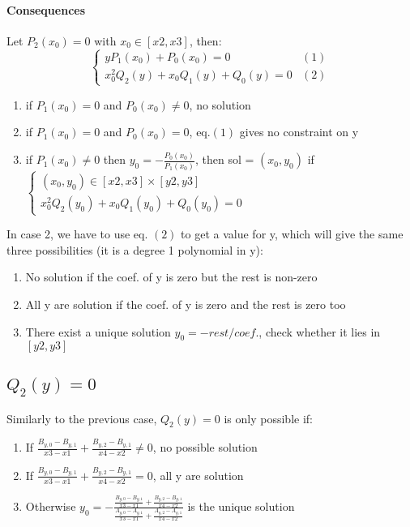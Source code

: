 \documentclass[paper=a4, fontsize=11pt]{scrartcl}
\numberwithin{equation}{section}		%
\numberwithin{figure}{section}			%
\numberwithin{table}{section}				%
\begin{document}
\paragraph{\textbf{Consequences}}

Let $P_2(x_0)=0$ with $x_0 \in [x2,x3]$, then:
$$
\left \{
\begin{array}{ll}
yP_1(x_0) + P_0(x_0) = 0 & (1)\\
x_0^2 Q_2(y) + x_0Q_1(y) + Q_0(y) = 0 & (2)
\end{array}
\right.
$$

\begin{enumerate}
\item if $P_1(x_0)=0$ and $P_0(x_0)\neq0$, no solution
\item if $P_1(x_0)=0$ and $P_0(x_0)=0$, eq.$(1)$ gives no constraint on y
\item if $P_1(x_0)\neq0$ then $y_0 = -\frac{P_0(x_0)}{P_1(x_0)}$, then sol = $(x_0,y_0)$ if $\left\{\begin{array}{l}(x_0,y_0) \in [x2,x3]\times[y2,y3]\\x_0^2 Q_2(y_0) + x_0Q_1(y_0) + Q_0(y_0) = 0 \end{array}\right.$
\end{enumerate}

In case 2, we have to use eq. $(2)$ to get a value for y, which will give the same three possibilities (it is a degree 1 polynomial in y):
\begin{enumerate}
\item No solution if the coef. of y is zero but the rest is non-zero
\item All y are solution if the coef. of y is zero and the rest is zero too
\item There exist a unique solution $y_0 = -rest/coef.$, check whether it lies in $[y2,y3]$
\end{enumerate}


\newpage
\subsection{$Q_2(y) = 0$}

Similarly to the previous case, $Q_2(y) = 0$ is only possible if:
\begin{enumerate}
\item If $\frac{B_{y,0}-B_{y,1}}{x3-x1} + \frac{B_{y,2}-B_{y,1}}{x4-x2} \neq 0$, no possible solution
\item If $\frac{B_{y,0}-B_{y,1}}{x3-x1} + \frac{B_{y,2}-B_{y,1}}{x4-x2} = 0$, all y are solution
\item Otherwise $y_0 = -\frac{\frac{B_{y,0}-B_{y,1}}{x3-x1} + \frac{B_{y,2}-B_{y,1}}{x4-x2}}{\frac{A_{y,0}-A_{y,1}}{x3-x1} + \frac{A_{y,2}-A_{y,1}}{x4-x2}}$ is the unique solution
\end{enumerate}
\end{document}
